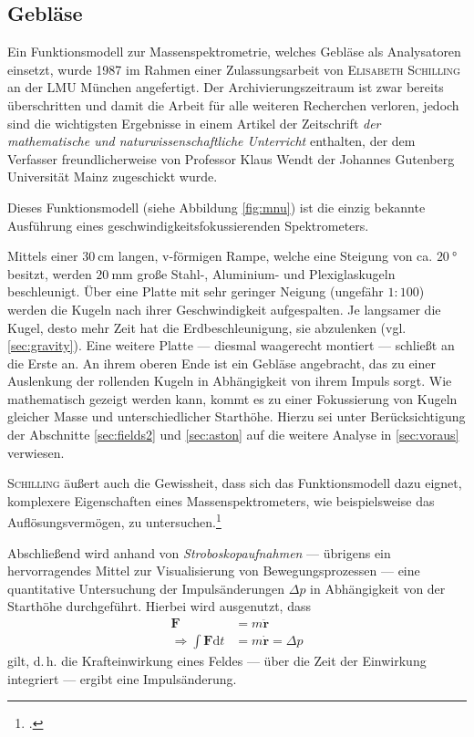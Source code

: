\subsection{Gebläse}

Ein Funktionsmodell zur Massenspektrometrie, welches Gebläse als Analysatoren einsetzt, wurde 1987 im Rahmen einer Zulassungsarbeit von \textsc{Elisabeth Schilling} an der LMU München angefertigt. Der Archivierungszeitraum ist zwar bereits überschritten und damit die Arbeit für alle weiteren Recherchen verloren, jedoch sind die wichtigsten Ergebnisse in einem Artikel der Zeitschrift \textit{der mathematische und naturwissenschaftliche Unterricht} enthalten, der dem Verfasser freundlicherweise von Professor Klaus Wendt der Johannes Gutenberg Universität Mainz zugeschickt wurde.

Dieses Funktionsmodell (siehe Abbildung \ref{fig:mnu}) ist die einzig bekannte Ausführung eines geschwindigkeitsfokussierenden Spektrometers. 

Mittels einer $\SI{30}{\centi\metre}$ langen, v-förmigen Rampe, welche eine Steigung von ca. $\SI{20}{\degree}$ besitzt, werden $\SI{20}{\milli\metre}$ große Stahl-, Aluminium- und Plexiglaskugeln beschleunigt. Über eine Platte mit sehr geringer Neigung (ungefähr $1:100$) werden die Kugeln nach ihrer Geschwindigkeit aufgespalten. Je langsamer die Kugel, desto mehr Zeit hat die Erdbeschleunigung, sie abzulenken (vgl. \ref{sec:gravity}). Eine weitere Platte --- diesmal waagerecht montiert --- schließt an die Erste an. An ihrem oberen Ende ist ein Gebläse angebracht, das zu einer Auslenkung der rollenden Kugeln in Abhängigkeit von ihrem Impuls sorgt. Wie mathematisch gezeigt werden kann, kommt es zu einer Fokussierung von Kugeln gleicher Masse und unterschiedlicher Starthöhe. Hierzu sei unter Berücksichtigung der Abschnitte \ref{sec:fields2} und \ref{sec:aston} auf die weitere Analyse in \ref{sec:voraus} verwiesen.

\textsc{Schilling} äußert auch die Gewissheit, dass sich das Funktionsmodell dazu eignet, komplexere Eigenschaften eines Massenspektrometers, wie beispielsweise das Auflösungsvermögen, zu untersuchen.\footcite[vgl.][S.\,37]{Schilling1987}


Abschließend wird anhand von \textit{Stroboskopaufnahmen} --- übrigens ein hervorragendes Mittel zur Visualisierung von Bewegungsprozessen --- eine quantitative Untersuchung der Impulsänderungen $\Delta p$ in Abhängigkeit von der Starthöhe durchgeführt. Hierbei wird ausgenutzt, dass 
\begin{equation}
\begin{alignedat}{2}
\label{eq:impulsaenderung}
\boldsymbol{F}&=m\boldsymbol{\ddot{r}}\\
\Rightarrow \int \boldsymbol{F}\mathrm{d}t &=m\boldsymbol{\dot{r}}=\Delta p
\end{alignedat}
\end{equation} 
gilt, d.\,h. die Krafteinwirkung eines Feldes --- über die Zeit der Einwirkung integriert --- ergibt eine Impulsänderung.

